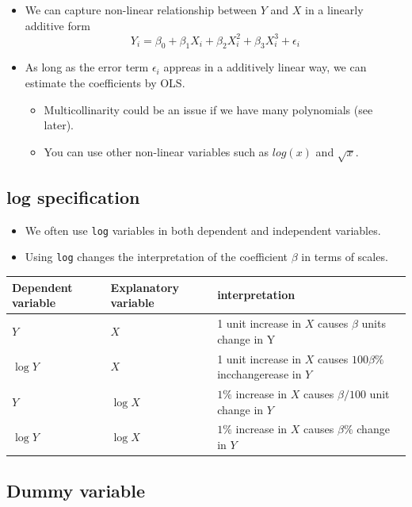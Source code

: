 \documentclass[]{book}
\providecommand{\tightlist}{%
  \setlength{\itemsep}{0pt}\setlength{\parskip}{0pt}}
\begin{document}
\begin{itemize}
\tightlist
\item
  We can capture non-linear relationship between \(Y\) and \(X\) in a
  linearly additive form \[
  Y_i = \beta_0 + \beta_1 X_i + \beta_2 X_i^2 + \beta_3 X_i^3 + \epsilon_i
  \]
\item
  As long as the error term \(\epsilon_i\) appreas in a additively
  linear way, we can estimate the coefficients by OLS.

  \begin{itemize}
  \tightlist
  \item
    Multicollinarity could be an issue if we have many polynomials (see
    later).
  \item
    You can use other non-linear variables such as \(log(x)\) and
    \(\sqrt{x}\).
  \end{itemize}
\end{itemize}

\subsection{log specification}\label{log-specification}

\begin{itemize}
\tightlist
\item
  We often use \texttt{log} variables in both dependent and independent
  variables.
\item
  Using \texttt{log} changes the interpretation of the coefficient
  \(\beta\) in terms of scales.
\end{itemize}

\begin{longtable}[]{@{}lll@{}}
\toprule
Dependent variable & Explanatory variable &
interpretation\tabularnewline
\midrule
\endhead
\(Y\) & \(X\) & 1 unit increase in \(X\) causes \(\beta\) units change
in Y\tabularnewline
\(\log Y\) & \(X\) & 1 unit increase in \(X\) causes \(100 \beta \%\)
incchangerease in \(Y\)\tabularnewline
\(Y\) & \(\log X\) & \(1\%\) increase in \(X\) causes \(\beta / 100\)
unit change in \(Y\)\tabularnewline
\(\log Y\) & \(\log X\) & \(1\%\) increase in \(X\) causes \(\beta \%\)
change in \(Y\)\tabularnewline
\bottomrule
\end{longtable}

\subsection{Dummy variable}\label{dummy-variable}
\end{document}
